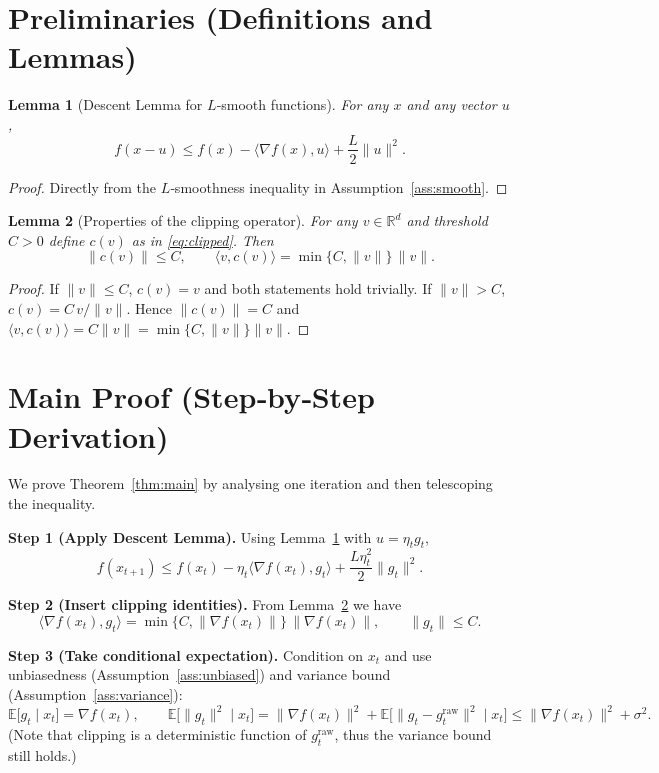 \documentclass{article}
\newtheorem{lemma}{Lemma}
\begin{document}
\section*{Preliminaries (Definitions and Lemmas)}
\begin{lemma}[Descent Lemma for $L$‑smooth functions]\label{lem:descent}
For any $x$ and any vector $u$,
\[
f(x-u)\le f(x)-\langle\nabla f(x),u\rangle+\frac{L}{2}\|u\|^2 .
\]
\end{lemma}
\begin{proof}
Directly from the $L$‑smoothness inequality in Assumption~\ref{ass:smooth}.
\end{proof}

\begin{lemma}[Properties of the clipping operator]\label{lem:clip}
For any $v\in\mathbb{R}^d$ and threshold $C>0$ define $c(v)$ as in
\eqref{eq:clipped}. Then
\[
\|c(v)\|\le C,\qquad
\langle v, c(v)\rangle = \min\{C,\|v\|\}\,\|v\| .
\]
\end{lemma}
\begin{proof}
If $\|v\|\le C$, $c(v)=v$ and both statements hold trivially.
If $\|v\|>C$, $c(v)=C\,v/\|v\|$.
Hence $\|c(v)\|=C$ and
$\langle v,c(v)\rangle = C\|v\| = \min\{C,\|v\|\}\|v\|$.
\end{proof}

\section*{Main Proof (Step‑by‑Step Derivation)}
We prove Theorem~\ref{thm:main} by analysing one iteration and then
telescoping the inequality.

\noindent\textbf{Step 1 (Apply Descent Lemma).}
Using Lemma~\ref{lem:descent} with $u=\eta_t g_t$,
\[
f(x_{t+1}) \le f(x_t)-\eta_t\langle\nabla f(x_t),g_t\rangle
+\frac{L\eta_t^2}{2}\|g_t\|^2 . \tag{1}
\]

\noindent\textbf{Step 2 (Insert clipping identities).}
From Lemma~\ref{lem:clip} we have
\[
\langle\nabla f(x_t),g_t\rangle
=\min\{C,\|\nabla f(x_t)\|\}\,\|\nabla f(x_t)\| ,\qquad
\|g_t\|\le C . \tag{2}
\]

\noindent\textbf{Step 3 (Take conditional expectation).}
Condition on $x_t$ and use unbiasedness (Assumption~\ref{ass:unbiased}) and
variance bound (Assumption~\ref{ass:variance}):
\[
\mathbb{E}\!\bigl[g_t\mid x_t\bigr]=\nabla f(x_t),\qquad
\mathbb{E}\!\bigl[\|g_t\|^2\mid x_t\bigr]
= \|\nabla f(x_t)\|^2+\mathbb{E}\!\bigl[\|g_t-g_t^{\text{raw}}\|^2\mid x_t\bigr]
\le \|\nabla f(x_t)\|^2+\sigma^2 . \tag{3}
\]
(Note that clipping is a deterministic function of $g_t^{\text{raw}}$, thus
the variance bound still holds.)
\end{document}
